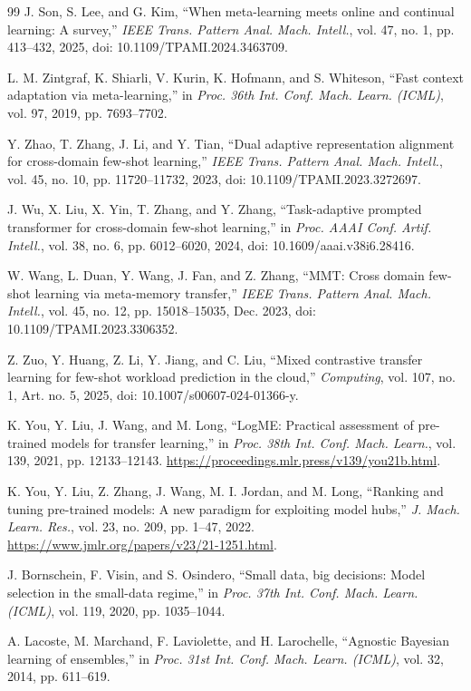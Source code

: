 \documentclass[a4paper,fleqn]{cas-sc}
\begin{document}
\begin{thebibliography}{99}
J. Son, S. Lee, and G. Kim, ``When meta-learning meets online and continual learning: A survey,'' \emph{IEEE Trans. Pattern Anal. Mach. Intell.}, vol. 47, no. 1, pp. 413--432, 2025, doi: 10.1109/TPAMI.2024.3463709.

L. M. Zintgraf, K. Shiarli, V. Kurin, K. Hofmann, and S. Whiteson, ``Fast context adaptation via meta-learning,'' in \emph{Proc. 36th Int. Conf. Mach. Learn. (ICML)}, vol. 97, 2019, pp. 7693--7702.

Y. Zhao, T. Zhang, J. Li, and Y. Tian, ``Dual adaptive representation alignment for cross-domain few-shot learning,'' \emph{IEEE Trans. Pattern Anal. Mach. Intell.}, vol. 45, no. 10, pp. 11720--11732, 2023, doi: 10.1109/TPAMI.2023.3272697.

J. Wu, X. Liu, X. Yin, T. Zhang, and Y. Zhang, ``Task-adaptive prompted transformer for cross-domain few-shot learning,'' in \emph{Proc. AAAI Conf. Artif. Intell.}, vol. 38, no. 6, pp. 6012--6020, 2024, doi: 10.1609/aaai.v38i6.28416.

W. Wang, L. Duan, Y. Wang, J. Fan, and Z. Zhang, ``MMT: Cross domain few-shot learning via meta-memory transfer,'' \emph{IEEE Trans. Pattern Anal. Mach. Intell.}, vol. 45, no. 12, pp. 15018--15035, Dec. 2023, doi: 10.1109/TPAMI.2023.3306352.

Z. Zuo, Y. Huang, Z. Li, Y. Jiang, and C. Liu, ``Mixed contrastive transfer learning for few-shot workload prediction in the cloud,'' \emph{Computing}, vol. 107, no. 1, Art. no. 5, 2025, doi: 10.1007/s00607-024-01366-y.

K. You, Y. Liu, J. Wang, and M. Long, ``LogME: Practical assessment of pre-trained models for transfer learning,'' in \emph{Proc. 38th Int. Conf. Mach. Learn.}, vol. 139, 2021, pp. 12133--12143. \url{https://proceedings.mlr.press/v139/you21b.html}.

K. You, Y. Liu, Z. Zhang, J. Wang, M. I. Jordan, and M. Long, ``Ranking and tuning pre-trained models: A new paradigm for exploiting model hubs,'' \emph{J. Mach. Learn. Res.}, vol. 23, no. 209, pp. 1--47, 2022. \url{https://www.jmlr.org/papers/v23/21-1251.html}.

J. Bornschein, F. Visin, and S. Osindero,
``Small data, big decisions: Model selection in the small-data regime,''
in \emph{Proc. 37th Int. Conf. Mach. Learn. (ICML)},
vol. 119, 2020, pp. 1035--1044.

A. Lacoste, M. Marchand, F. Laviolette, and H. Larochelle,
``Agnostic Bayesian learning of ensembles,''
in \emph{Proc. 31st Int. Conf. Mach. Learn. (ICML)},
vol. 32, 2014, pp. 611--619.


\end{thebibliography}
\end{document}

